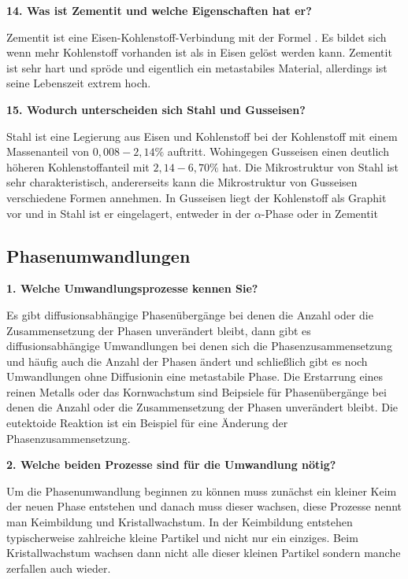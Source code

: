 \noindent\textbf{14. Was ist Zementit und welche Eigenschaften hat er?}\\
\begin{addmargin}[25pt]{0pt}
Zementit ist eine Eisen-Kohlenstoff-Verbindung mit der Formel . Es bildet sich wenn mehr Kohlenstoff vorhanden ist als in Eisen gelöst werden kann. Zementit ist sehr hart und spröde und eigentlich ein metastabiles Material, allerdings ist seine Lebenszeit extrem hoch.\\
\end{addmargin}

\noindent\textbf{15. Wodurch unterscheiden sich Stahl und Gusseisen?}\\
\begin{addmargin}[25pt]{0pt}
Stahl ist eine Legierung aus Eisen und Kohlenstoff bei der Kohlenstoff mit einem Massenanteil von $0,008-2,14 \%$ auftritt. Wohingegen Gusseisen einen deutlich höheren Kohlenstoffanteil mit $2,14-6,70 \%$ hat. Die Mikrostruktur von Stahl ist sehr charakteristisch, andererseits kann die Mikrostruktur von Gusseisen verschiedene Formen annehmen. In Gusseisen liegt der Kohlenstoff als Graphit vor und in Stahl ist er eingelagert, entweder in der $\alpha$-Phase oder in Zementit  \\
\end{addmargin}


\subsection{Phasenumwandlungen}

\noindent\textbf{1. Welche Umwandlungsprozesse kennen Sie?}\\
\begin{addmargin}[25pt]{0pt}
Es gibt diffusionsabhängige Phasenübergänge bei denen die Anzahl oder die Zusammensetzung der Phasen unverändert bleibt, dann gibt es diffusionsabhängige Umwandlungen bei denen sich die Phasenzusammensetzung und häufig auch die Anzahl der Phasen ändert und schließlich gibt es noch Umwandlungen ohne Diffusionin eine metastabile Phase. Die Erstarrung eines reinen Metalls oder das Kornwachstum sind Beipsiele für Phasenübergänge bei denen die Anzahl oder die Zusammensetzung der Phasen unverändert bleibt. Die eutektoide Reaktion ist ein Beispiel für eine Änderung der Phasenzusammensetzung.\\
\end{addmargin}

\noindent\textbf{2. Welche beiden Prozesse sind für die Umwandlung nötig?}\\
\begin{addmargin}[25pt]{0pt}
Um die Phasenumwandlung beginnen zu können muss zunächst ein kleiner Keim der neuen Phase entstehen und danach muss dieser wachsen, diese Prozesse nennt man Keimbildung und Kristallwachstum. In der Keimbildung entstehen typischerweise zahlreiche kleine Partikel und nicht nur ein einziges. Beim Kristallwachstum wachsen dann nicht alle dieser kleinen Partikel sondern manche zerfallen auch wieder. \\
\end{addmargin}

